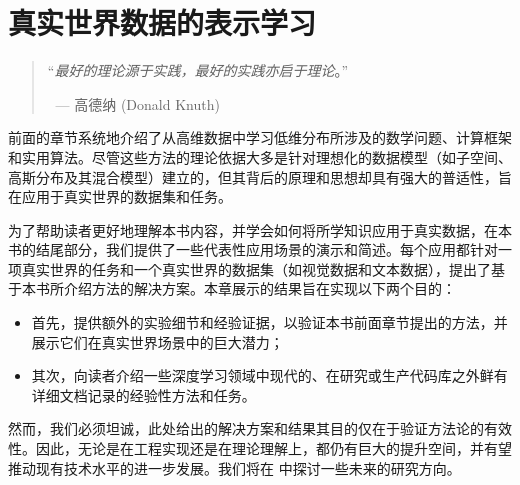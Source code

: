 \documentclass[../../book-main.tex]{subfiles}
\begin{document}
\chapter{真实世界数据的表示学习}
\label{ch:applications}

\begin{quote}
\hfill    ``{\em 最好的理论源于实践，最好的实践亦启于理论}。''

$~$ \hfill --- 高德纳 (Donald Knuth)
\end{quote}
\vspace{5mm}

前面的章节系统地介绍了从高维数据中学习低维分布所涉及的数学问题、计算框架和实用算法。尽管这些方法的理论依据大多是针对理想化的数据模型（如子空间、高斯分布及其混合模型）建立的，但其背后的原理和思想却具有强大的普适性，旨在应用于真实世界的数据集和任务。

为了帮助读者更好地理解本书内容，并学会如何将所学知识应用于真实数据，在本书的结尾部分，我们提供了一些代表性应用场景的演示和简述。每个应用都针对一项真实世界的任务和一个真实世界的数据集（如视觉数据和文本数据），提出了基于本书所介绍方法的解决方案。本章展示的结果旨在实现以下两个目的：
\begin{itemize}
    \item 首先，提供额外的实验细节和经验证据，以验证本书前面章节提出的方法，并展示它们在真实世界场景中的巨大潜力；
    \item 其次，向读者介绍一些深度学习领域中现代的、在研究或生产代码库之外鲜有详细文档记录的经验性方法和任务。
\end{itemize}
然而，我们必须坦诚，此处给出的解决方案和结果其目的仅在于验证方法论的有效性。因此，无论是在工程实现还是在理论理解上，都仍有巨大的提升空间，并有望推动现有技术水平的进一步发展。我们将在  中探讨一些未来的研究方向。



\end{document}
